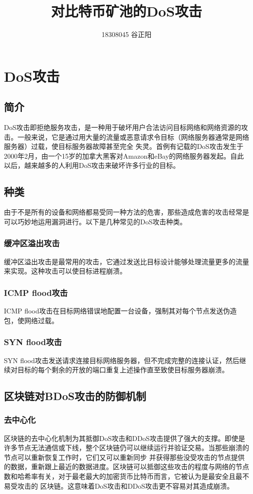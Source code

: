 \documentclass[UTF8,12pt]{article}
\title{对比特币矿池的DoS攻击}
\date{}
\author{18308045 谷正阳}
\begin{document}
\maketitle
\section{DoS攻击}
\subsection{简介}
DoS攻击即拒绝服务攻击，是一种用于破坏用户合法访问目标网络和网络资源的攻击。一般来说，它是通过用大量的流量或恶意请求令目标（网络服务器通常是网络服务器）过载，使目标服务器故障甚至完全
失灵。首例有记载的DoS攻击发生于2000年2月，由一个15岁的加拿大黑客对Amazon和eBay的网络服务器发起。自此以后，越来越多的人利用DoS攻击来破坏许多行业的目标。
\subsection{种类}
由于不是所有的设备和网络都易受同一种方法的危害，那些造成危害的攻击经常是可以巧妙地运用漏洞进行。以下是几种常见的DoS攻击种类。
\subsubsection{缓冲区溢出攻击}
缓冲区溢出攻击是最常用的攻击，它通过发送比目标设计能够处理流量更多的流量来实现。这种攻击可以使目标进程崩溃。
\subsubsection{ICMP flood攻击}
ICMP flood攻击在目标网络错误地配置一台设备，强制其对每个节点发送伪造包，使网络过载。
\subsubsection{SYN flood攻击}
SYN flood攻击发送请求连接目标网络服务器，但不完成完整的连接认证，然后继续对目标的每个剩余的开放的端口重复上述操作直至致使目标服务器崩溃。
\subsection{区块链对BDoS攻击的防御机制}
\subsubsection{去中心化}
区块链的去中心化机制为其抵御DoS攻击和DDoS攻击提供了强大的支撑。即使是许多节点无法通信或下线，整个区块链仍可以继续运行并验证交易。当那些崩溃的节点可以重新恢复工作时，它们又可以重新同步
并获得那些没受攻击的节点提供的数据，重新跟上最近的数据进度。区块链可以抵御这些攻击的程度与网络的节点数和哈希率有关，对于最老最大的加密货币比特币而言，它被认为是最安全且最不易受攻击的
区块链。这意味着DoS攻击和DDoS攻击更不容易对其造成崩溃。
\end{document}
